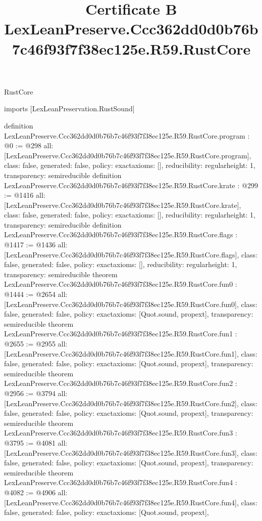 \begin{lexlean}{RustCore}
\title{Certificate B LexLeanPreserve.Ccc362dd0d0b76b7c46f93f7f38ec125e.R59.RustCore}
\begin{coremodule}
imports [LexLeanPreservation.RustSound]

definition LexLeanPreserve.Ccc362dd0d0b76b7c46f93f7f38ec125e.R59.RustCore.program : @0 := @298 {
  all: [LexLeanPreserve.Ccc362dd0d0b76b7c46f93f7f38ec125e.R59.RustCore.program],
  class: false,
  generated: false,
  policy: exact{axioms: []},
  reducibility: regular{height: 1},
  transparency: semireducible
}
definition LexLeanPreserve.Ccc362dd0d0b76b7c46f93f7f38ec125e.R59.RustCore.krate : @299 := @1416 {
  all: [LexLeanPreserve.Ccc362dd0d0b76b7c46f93f7f38ec125e.R59.RustCore.krate],
  class: false,
  generated: false,
  policy: exact{axioms: []},
  reducibility: regular{height: 1},
  transparency: semireducible
}
definition LexLeanPreserve.Ccc362dd0d0b76b7c46f93f7f38ec125e.R59.RustCore.flags : @1417 := @1436 {
  all: [LexLeanPreserve.Ccc362dd0d0b76b7c46f93f7f38ec125e.R59.RustCore.flags],
  class: false,
  generated: false,
  policy: exact{axioms: []},
  reducibility: regular{height: 1},
  transparency: semireducible
}
theorem LexLeanPreserve.Ccc362dd0d0b76b7c46f93f7f38ec125e.R59.RustCore.fun0 : @1444 := @2654 {
  all: [LexLeanPreserve.Ccc362dd0d0b76b7c46f93f7f38ec125e.R59.RustCore.fun0],
  class: false,
  generated: false,
  policy: exact{axioms: [Quot.sound, propext]},
  transparency: semireducible
}
theorem LexLeanPreserve.Ccc362dd0d0b76b7c46f93f7f38ec125e.R59.RustCore.fun1 : @2655 := @2955 {
  all: [LexLeanPreserve.Ccc362dd0d0b76b7c46f93f7f38ec125e.R59.RustCore.fun1],
  class: false,
  generated: false,
  policy: exact{axioms: [Quot.sound, propext]},
  transparency: semireducible
}
theorem LexLeanPreserve.Ccc362dd0d0b76b7c46f93f7f38ec125e.R59.RustCore.fun2 : @2956 := @3794 {
  all: [LexLeanPreserve.Ccc362dd0d0b76b7c46f93f7f38ec125e.R59.RustCore.fun2],
  class: false,
  generated: false,
  policy: exact{axioms: [Quot.sound, propext]},
  transparency: semireducible
}
theorem LexLeanPreserve.Ccc362dd0d0b76b7c46f93f7f38ec125e.R59.RustCore.fun3 : @3795 := @4081 {
  all: [LexLeanPreserve.Ccc362dd0d0b76b7c46f93f7f38ec125e.R59.RustCore.fun3],
  class: false,
  generated: false,
  policy: exact{axioms: [Quot.sound, propext]},
  transparency: semireducible
}
theorem LexLeanPreserve.Ccc362dd0d0b76b7c46f93f7f38ec125e.R59.RustCore.fun4 : @4082 := @4906 {
  all: [LexLeanPreserve.Ccc362dd0d0b76b7c46f93f7f38ec125e.R59.RustCore.fun4],
  class: false,
  generated: false,
  policy: exact{axioms: [Quot.sound, propext]},
}
\end{coremodule}
\end{lexlean}
